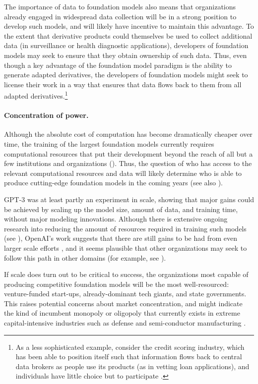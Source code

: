 The importance of data to foundation models also means that organizations already engaged in widespread data collection will be in a strong position to develop such models, and will likely have incentive to maintain this advantage. 
To the extent that derivative products could themselves be used to collect additional data (\eg in surveillance or health diagnostic applications), developers of foundation models may seek to ensure that they obtain ownership of such data. 
Thus, even though a key advantage of the foundation model paradigm is the ability to generate adapted derivatives, the developers of foundation models might seek to license their work in a way that ensures that data flows back to them from all adapted derivatives.\footnote{As a less sophisticated example, consider the credit scoring industry, which has been able to position itself such that information flows back to central data brokers as people use its products (as in vetting loan applications), and individuals have little choice but to participate \citep{lauer.2017}.}

\paragraph{Concentration of power.} 

Although the absolute cost of computation has become dramatically cheaper over time, the training of the largest foundation models currently requires computational resources that put their development beyond the reach of all but a few institutions and organizations (). Thus, the question of who has access to the relevant computational resources and data will likely determine who is able to produce cutting-edge foundation models in the coming years (see also ).

GPT-3 was at least partly an experiment in scale, showing that major gains could be achieved by scaling up the model size, amount of data, and training time, without major modeling innovations. 
Although there is extensive ongoing research into reducing the amount of resources required in training such models (see ), OpenAI's work suggests that there are still gains to be had from even larger scale efforts \citep{kaplan2020}, and it seems plausible that other organizations may seek to follow this path in other domains (for example, see \citep{jurassic1}).

If scale does turn out to be critical to success, the organizations most capable of producing competitive foundation models will be the most well-resourced:  venture-funded start-ups, already-dominant tech giants, and state governments.  This raises potential concerns about market concentration, and might indicate the kind of incumbent monopoly or oligopoly that currently exists in extreme capital-intensive industries such as defense and semi-conductor manufacturing \citep{carril.2020}.

